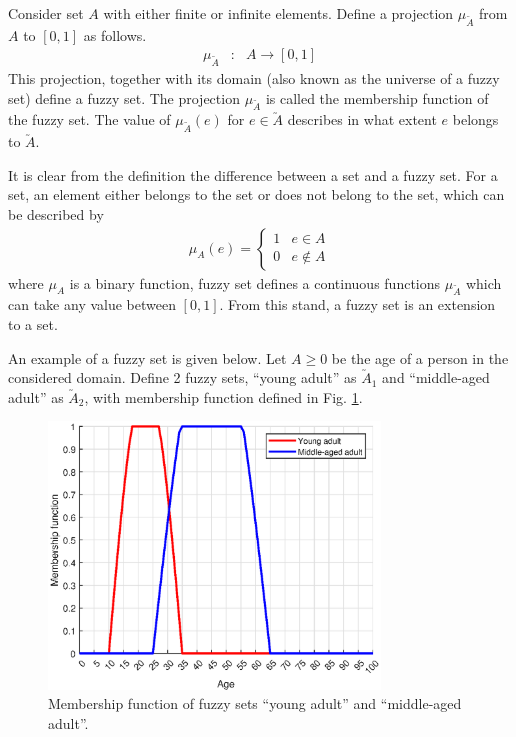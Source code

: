 Consider set $A$ with either finite or infinite elements. Define a projection $\mu_{\utilde{A}}$ from $A$ to $[0, 1]$ as follows.
\begin{eqnarray}
	\mu_{\utilde{A}} &:& A \rightarrow [0, 1] \nonumber
\end{eqnarray}
This projection, together with its domain (also known as the universe of a fuzzy set) define a fuzzy set. The projection $\mu_{\utilde{A}}$ is called the membership function of the fuzzy set. The value of $\mu_{\utilde{A}}(e)$ for $e\in \utilde{A}$ describes in what extent $e$ belongs to $\utilde{A}$.

It is clear from the definition the difference between a set and a fuzzy set. For a set, an element either belongs to the set or does not belong to the set, which can be described by
\begin{eqnarray}
	\mu_{A}(e) = \left\{\begin{array}{cc}
		1 & e \in A \\
		0 & e \notin A
	\end{array}\right. \nonumber
\end{eqnarray}
where $\mu_{A}$ is a binary function, fuzzy set defines a continuous functions $\mu_{\utilde{A}}$ which can take any value between $[0,1]$. From this stand, a fuzzy set is an extension to a set.

An example of a fuzzy set is given below. Let $A\geq 0$ be the age of a person in the considered domain. Define 2 fuzzy sets, ``young adult'' as $\utilde{A}_1$ and ``middle-aged adult'' as $\utilde{A}_2$, with membership function defined in Fig. \ref{ch:fcs:fig:fuzzysetexp}.

\begin{figure}
	\centering
	\includegraphics[width=250pt]{chapters/ch-fuzzy-control-system/figures/fuzzysetexp.eps}
	\caption{Membership function of fuzzy sets ``young adult'' and ``middle-aged adult''.} \label{ch:fcs:fig:fuzzysetexp}
\end{figure}

